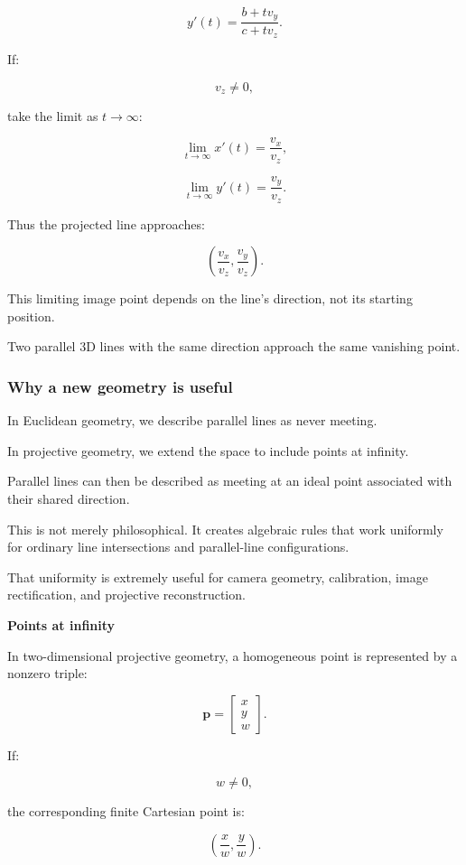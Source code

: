 \[
 y'(t)=\frac{b+tv_y}{c+tv_z}.
\]

If:

\[
 v_z\ne0,
\]

take the limit as \(t\to\infty\):

\[
 \lim_{t\to\infty}x'(t)=\frac{v_x}{v_z},
\]

\[
 \lim_{t\to\infty}y'(t)=\frac{v_y}{v_z}.
\]

Thus the projected line approaches:

\[
 \boxed{ \left( \frac{v_x}{v_z}, \frac{v_y}{v_z} \right) }.
\]

This limiting image point depends on the line's direction, not its starting position.

Two parallel 3D lines with the same direction approach the same vanishing point.

\subsubsection{Why a new geometry is useful}\label{02-foundations-ii-ch032-why-a-new-geometry-is-useful}

In Euclidean geometry, we describe parallel lines as never meeting.

In projective geometry, we extend the space to include points at infinity.

Parallel lines can then be described as meeting at an ideal point associated with their shared direction.

This is not merely philosophical. It creates algebraic rules that work uniformly for ordinary line intersections and parallel-line configurations.

That uniformity is extremely useful for camera geometry, calibration, image rectification, and projective reconstruction.

\textbf{Points at infinity}

In two-dimensional projective geometry, a homogeneous point is represented by a nonzero triple:

\[
 \boxed{ \mathbf p= \begin{bmatrix} x\\y\\w \end{bmatrix} }.
\]

If:

\[
 w\ne0,
\]

the corresponding finite Cartesian point is:

\[
 \boxed{ \left(\frac xw,\frac yw\right) }.
\]


